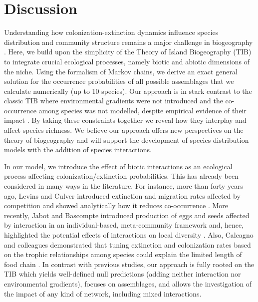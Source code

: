 \section{Discussion}

Understanding how colonization-extinction dynamics influence species distribution and community structure remains a major challenge in biogeography \citep{Wiens2011, Jabot2012, Godsoe2012}. Here, we build upon the simplicity of the Theory of Island Biogeography (TIB) to integrate crucial ecological processes, namely biotic and abiotic dimensions of the niche. Using the formalism of Markov chains, we derive an exact general solution for the occurrence probabilities of all possible assemblages that we calculate numerically (up to 10 species). Our approach is in stark contrast to the classic TIB \citep{MacArthur1967} where environmental gradients were not introduced and the co-occurrence among species was not modelled, despite empirical evidence of their impact \citep{Diamond1982}. By taking these constraints together we reveal how they interplay and affect species richness. We believe our approach offers new perspectives on the theory of biogeography and will support the development of species distribution models with the addition of species interactions.

In our model, we introduce the effect of biotic interactions as an ecological process affecting colonization/extinction probabilities. This has already been considered in many ways in the literature. For instance, more than forty years ago, Levins and Culver introduced extinction and migration rates affected by competition and showed analytically how it reduces co-occurrence \citep{Levins1971}. More recently, Jabot and Bascompte introduced production of eggs and seeds affected by interaction in an individual-based, meta-community framework and, hence, highlighted the potential effects of interactions on local diversity \citep{Jabot2012}. Also, Calcagno and colleagues demonstrated that tuning extinction and colonization rates based on the trophic relationships among species could explain the limited length of food chain \citep{Calcagno2011}. In contrast with previous studies, our approach is fully rooted on the TIB which yields well-defined null predictions (adding neither interaction nor environmental gradients), focuses on assemblages, and allows the investigation of the impact of any kind of network, including mixed interactions.

